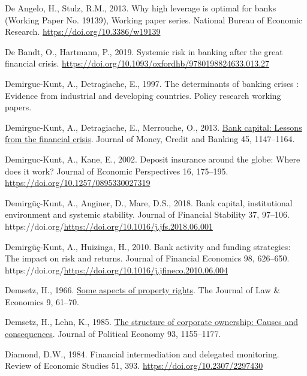 \documentclass[
  12pt,
  a4paper,
]{scrreprt}
\newlength{\cslhangindent}
\newenvironment{CSLReferences}[2] %
 {\begin{list}{}{%
  \setlength{\itemindent}{0pt}
  \setlength{\leftmargin}{0pt}
  \setlength{\parsep}{0pt}
  \ifodd #1
   \setlength{\leftmargin}{\cslhangindent}
   \setlength{\itemindent}{-1\cslhangindent}
  \fi
  \setlength{\itemsep}{#2\baselineskip}}}
 {\end{list}}
\begin{document}
\begin{CSLReferences}{1}{0}
De Angelo, H., Stulz, R.M., 2013. Why high leverage is optimal for banks
(Working Paper No. 19139), Working paper series. National Bureau of
Economic Research. \url{https://doi.org/10.3386/w19139}

De Bandt, O., Hartmann, P., 2019. Systemic risk in banking after the
great financial crisis.
\url{https://doi.org/10.1093/oxfordhb/9780198824633.013.27}

Demirguc-Kunt, A., Detragiache, E., 1997. The determinants of banking
crises : Evidence from industrial and developing countries. Policy
research working papers.

Demirguc-Kunt, A., Detragiache, E., Merrouche, O., 2013.
\href{http://www.jstor.org.queens.ezp1.qub.ac.uk/stable/23463595}{Bank
capital: Lessons from the financial crisis}. Journal of Money, Credit
and Banking 45, 1147--1164.

Demirguc-Kunt, A., Kane, E., 2002. Deposit insurance around the globe:
Where does it work? Journal of Economic Perspectives 16, 175--195.
\url{https://doi.org/10.1257/0895330027319}

Demirgüç-Kunt, A., Anginer, D., Mare, D.S., 2018. Bank capital,
institutional environment and systemic stability. Journal of Financial
Stability 37, 97--106.
https://doi.org/\url{https://doi.org/10.1016/j.jfs.2018.06.001}

Demirgüç-Kunt, A., Huizinga, H., 2010. Bank activity and funding
strategies: The impact on risk and returns. Journal of Financial
Economics 98, 626--650.
https://doi.org/\url{https://doi.org/10.1016/j.jfineco.2010.06.004}

Demsetz, H., 1966. \href{http://www.jstor.org/stable/724993}{Some
aspects of property rights}. The Journal of Law \& Economics 9, 61--70.

Demsetz, H., Lehn, K., 1985.
\href{http://www.jstor.org/stable/1833178}{The structure of corporate
ownership: Causes and consequences}. Journal of Political Economy 93,
1155--1177.

Diamond, D.W., 1984. Financial intermediation and delegated monitoring.
Review of Economic Studies 51, 393.
\url{https://doi.org/10.2307/2297430}


\end{CSLReferences}
\end{document}
